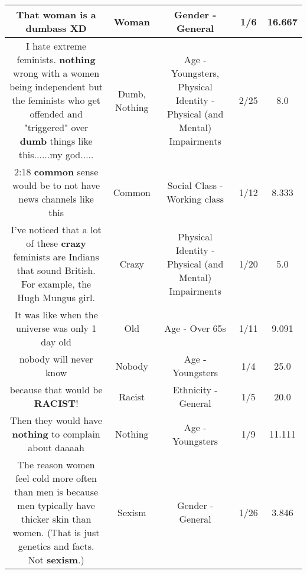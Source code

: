 \documentclass[11pt]{article}
\newlength\mylength
\begin{document}
\begin{center}
\begin{longtable}{|C{.65\mylength}|C{.30\mylength}|C{.12\mylength}|C{.12\mylength}|C{.12\mylength}|}
  \small That \textbf{woman} is a dumbass XD\normalsize   & Woman & Gender - General & 1/6 & 16.667 \\  \hline
  \small I hate extreme feminists. \textbf{nothing} wrong with a women being independent but the feminists who get offended and "triggered" over \textbf{dumb} things like this......my god.....\normalsize   & Dumb, Nothing & Age - Youngsters, Physical Identity - Physical (and Mental) Impairments & 2/25 & 8.0 \\  \hline
  \small 2:18 \textbf{common} sense would be to not have news channels like this\normalsize   & Common & Social Class - Working class & 1/12 & 8.333 \\  \hline
  \small I've noticed that a lot of these \textbf{crazy} feminists are Indians that sound British. For example, the Hugh Mungus girl.\normalsize   & Crazy & Physical Identity - Physical (and Mental) Impairments & 1/20 & 5.0 \\  \hline
  \small It was like when the universe was only 1 day old\normalsize   & Old & Age - Over 65s & 1/11 & 9.091 \\  \hline
  \small nobody will never know\normalsize   & Nobody & Age - Youngsters & 1/4 & 25.0 \\  \hline
  \small because that would be \textbf{RACIST}!\normalsize   & Racist & Ethnicity - General & 1/5 & 20.0 \\  \hline
  \small Then they would have \textbf{nothing} to complain about daaaah\normalsize   & Nothing & Age - Youngsters & 1/9 & 11.111 \\  \hline
  \small The reason women feel cold more often than men is because men typically have thicker skin than women. (That is just genetics and facts. Not \textbf{sexism}.)\normalsize   & Sexism & Gender - General & 1/26 & 3.846 \\  \hline

\end{longtable}
\end{center}
\end{document}
